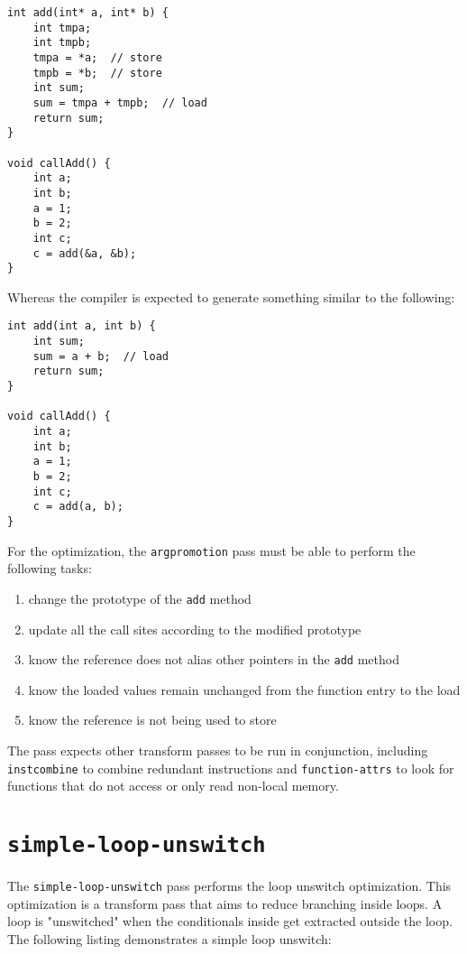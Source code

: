 \documentclass{article}
\begin{document}
\begin{lstlisting}[caption=\texttt{add} method compiled without optimizations,style=customC++]
int add(int* a, int* b) {
    int tmpa;
    int tmpb;
    tmpa = *a;  // store
    tmpb = *b;  // store
    int sum;
    sum = tmpa + tmpb;  // load
    return sum;
}

void callAdd() {
    int a;
    int b;
    a = 1;
    b = 2;
    int c;
    c = add(&a, &b);
}
\end{lstlisting}

Whereas the compiler is expected to generate something similar to the following:

\begin{lstlisting}[caption=Expected \texttt{add} method compiled with optimizations,style=customC++]
int add(int a, int b) {
    int sum;
    sum = a + b;  // load
    return sum;
}

void callAdd() {
    int a;
    int b;
    a = 1;
    b = 2;
    int c;
    c = add(a, b);
}
\end{lstlisting}

For the optimization, the \texttt{argpromotion} pass must be able to perform the following tasks:
\begin{enumerate}
    \item change the prototype of the \texttt{add} method
    \item update all the call sites according to the modified prototype
    \item know the reference does not alias other pointers in the \texttt{add} method
    \item know the loaded values remain unchanged from the function entry to the load
    \item know the reference is not being used to store
\end{enumerate}

The pass expects other transform passes to be run in conjunction, including \texttt{instcombine} to combine redundant instructions and \texttt{function-attrs} to look for functions that do not access or only read non-local memory.\cite{passes}

\section{\texttt{simple-loop-unswitch}} The \texttt{simple-loop-unswitch} pass performs the loop unswitch optimization. This optimization is a transform pass that aims to reduce branching inside loops. A loop is "unswitched" when the conditionals inside get extracted outside the loop. The following listing demonstrates a simple loop unswitch:
\end{document}
